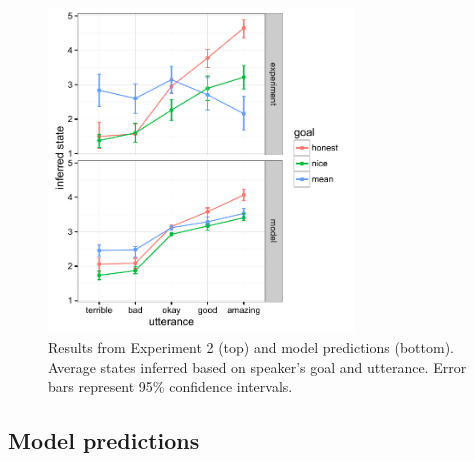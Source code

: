 \documentclass[10pt,letterpaper]{article}
\begin{document}
\begin{figure}
\begin{centering} 
\includegraphics[width=3.2in]{figures/exp3.pdf}
\caption{\label{fig:exp3} Results from Experiment 2 (top) and model predictions (bottom). Average states inferred based on speaker's goal and utterance. Error bars represent 95\% confidence intervals.}
\end{centering} 
\end{figure}




\subsection{Model predictions}
\end{document}

